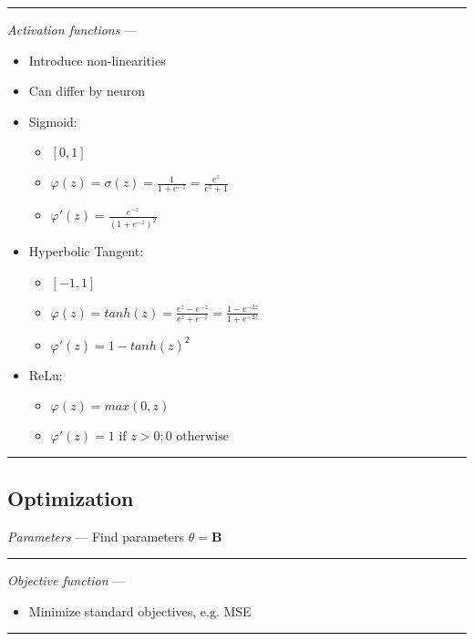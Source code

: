 {\color{lightgray}\hrule height 0.001mm}

\emph{Activation functions} --- 
\begin{itemize}
    \item Introduce non-linearities
    \item Can differ by neuron
    \item Sigmoid:
    \begin{itemize}
        \item $[0,1]$
        \item $\varphi(z) = \sigma(z) =  \frac{1}{1+e^{-z}} = \frac{e^z}{e^z + 1}$
        \item $\varphi'(z) = \frac{e^{-z}}{(1+e^{-z})^2}$
    \end{itemize}
    \item Hyperbolic Tangent:
    \begin{itemize}
        \item $[-1,1]$
        \item $\varphi(z) = tanh(z) =  \frac{e^z - e^{-z}}{e^z + e^{-z}} = \frac{1 - e^{-2z}}{1 + e^{-2z}}$
        \item $\varphi'(z) = 1-tanh(z)^2$
    \end{itemize}
    \item ReLu:
    \begin{itemize}
        \item $\varphi(z) = max(0,z)$
        \item $\varphi'(z) = 1 \textrm{ if } z > 0; 0 \textrm { otherwise}$
    \end{itemize}
\end{itemize}

{\color{black}\hrule height 0.001mm}

\subsection*{Optimization}
\emph{Parameters} --- Find parameters $\theta = \boldsymbol{B}$

{\color{lightgray}\hrule height 0.001mm}

\emph{Objective function} --- 
\begin{itemize}
    \item Minimize standard objectives, e.g. MSE
\end{itemize}

{\color{lightgray}\hrule height 0.001mm}

